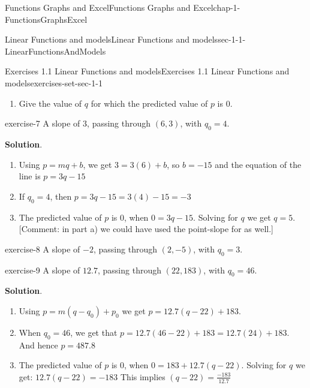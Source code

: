 \documentclass[oneside,10pt,]{book}
\numberwithin{equation}{section}
\begin{document}
\begin{chapterptx}{Functions Graphs and Excel}{}{Functions Graphs and Excel}{}{}{chap-1-FunctionsGraphsExcel}
\begin{sectionptx}{Linear Functions and models}{}{Linear Functions and models}{}{}{sec-1-1-LinearFunctionsAndModels}
\begin{exercises-subsection-numberless}{Exercises 1.1 Linear Functions and models}{}{Exercises 1.1 Linear Functions and models}{}{}{exercises-set-sec-1-1}
\begin{enumerate}[label=(\alph*)]
\item\hypertarget{li-38}{}\hypertarget{p-94}{}%
Give the value of \(q\) for which the predicted value of \(p\) is \(0\).%
\end{enumerate}
\begin{exercisegroup}
\begin{divisionexerciseeg}{7}{}{}{exercise-7}%
\hypertarget{p-95}{}%
A slope of \(3\), passing through \((6,3)\), with \(q_0=4\).%
\par\smallskip%
\noindent\textbf{Solution}.\hypertarget{solution-4}{}\quad%
\leavevmode%
\begin{enumerate}[label=(\alph*)]
\item\hypertarget{li-39}{}\hypertarget{p-96}{}%
Using \(p=m q+b\), we get \(3=3 (6)+b\), so \(b= -15\) and the equation of the line is \(p=3 q-15\)%
\item\hypertarget{li-40}{}\hypertarget{p-97}{}%
If \(q_0=4\), then \(p=3 q-15=3(4)-15= -3\)%
\item\hypertarget{li-41}{}\hypertarget{p-98}{}%
The predicted value of \(p\) is \(0\), when \(0=3 q-15\). Solving for \(q\) we get \(q=5\). [Comment: in part a) we could have used the point-slope for as well.]%
\end{enumerate}
\end{divisionexerciseeg}%
\begin{divisionexerciseeg}{8}{}{}{exercise-8}%
\hypertarget{p-99}{}%
A slope of \(-2\), passing through \((2,-5)\), with \(q_0=3\).%
\end{divisionexerciseeg}%
\begin{divisionexerciseeg}{9}{}{}{exercise-9}%
\hypertarget{p-100}{}%
A slope of \(12.7\), passing through \((22,183)\), with \(q_0=46\).%
\par\smallskip%
\noindent\textbf{Solution}.\hypertarget{solution-5}{}\quad%
\leavevmode%
\begin{enumerate}[label=(\alph*)]
\item\hypertarget{li-42}{}\hypertarget{p-101}{}%
Using \(p=m (q-q_0 )+p_0\)   we get \(p=12.7 (q-22)+183\).%
\item\hypertarget{li-43}{}\hypertarget{p-102}{}%
When \(q_0=46\), we get that \(p=12.7 (46-22)+183=12.7(24)+183\). And hence \(p=487.8\)%
\item\hypertarget{li-44}{}\hypertarget{p-103}{}%
The predicted value of \(p\) is \(0\), when \(0=183+12.7 (q-22)\). Solving for \(q\) we get: \(12.7 (q-22)= -183\) This implies \((q-22)= \frac{-183}{12.7}\)%
%
\begin{equation*}

\end{equation*}
\end{enumerate}
\end{divisionexerciseeg}
\end{exercisegroup}
\end{exercises-subsection-numberless}
\end{sectionptx}
\end{chapterptx}
\end{document}

